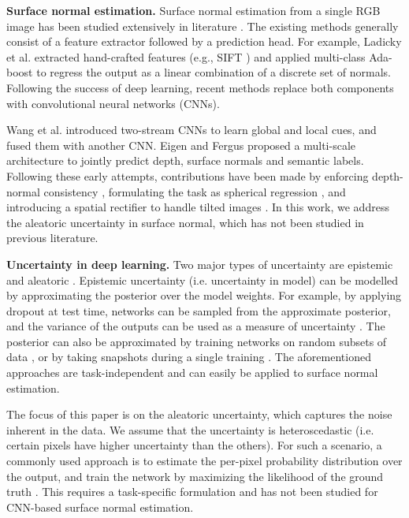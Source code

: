 \documentclass[10pt,twocolumn,letterpaper]{article}
\begin{document}
\noindent
\textbf{Surface normal estimation.} Surface normal estimation from a single RGB image has been studied extensively in literature \cite{SNfromRGB_13_3DP,SNfromRGB_14_Fouhey,SNfromRGB_14_Ladicky,SNfromRGB_15_Deep3D,SNfromRGB_15_Eigen,SNfromRGB_16_SkipNet,SNfromRGB_16_SURGE,SNfromRGB_18_GeoNet,SNfromRGB_19_FrameNet,SNfromRGB_19_PAP,SNfromRGB_19_SR,SNfromRGB_20_GeoNet++,SNfromRGB_20_TiltedSN,SNfromRGB_20_VPLNet}. The existing methods generally consist of a feature extractor followed by a prediction head. For example, Ladicky et al. \cite{SNfromRGB_14_Ladicky} extracted hand-crafted features (e.g., SIFT \cite{sift}) and applied multi-class Ada-boost \cite{adaboost} to regress the output as a linear combination of a discrete set of normals. Following the success of deep learning, recent methods replace both components with convolutional neural networks (CNNs). 

Wang et al. \cite{SNfromRGB_15_Deep3D} introduced two-stream CNNs to learn global and local cues, and fused them with another CNN. Eigen and Fergus \cite{SNfromRGB_15_Eigen} proposed a multi-scale architecture to jointly predict depth, surface normals and semantic labels. Following these early attempts, contributions have been made by enforcing depth-normal consistency \cite{SNfromRGB_18_GeoNet,SNfromRGB_20_GeoNet++}, formulating the task as spherical regression \cite{SNfromRGB_19_SR}, and introducing a spatial rectifier to handle tilted images \cite{SNfromRGB_20_TiltedSN}. In this work, we address the aleatoric uncertainty in surface normal, which has not been studied in previous literature.

\noindent
\textbf{Uncertainty in deep learning.} Two major types of uncertainty are epistemic and aleatoric \cite{aleatory_or_epistemic}. Epistemic uncertainty (i.e. uncertainty in model) can be modelled by approximating the posterior over the model weights. For example, by applying dropout \cite{dropout} at test time,  networks can be sampled from the approximate posterior, and the variance of the outputs can be used as a measure of uncertainty \cite{epiU-drop-gal}. The posterior can also be approximated by training  networks on random subsets of data \cite{epiU-2017-boot}, or by taking  snapshots during a single training \cite{epiU-2017-snap}. The aforementioned approaches are task-independent and can easily be applied to surface normal estimation.

The focus of this paper is on the aleatoric uncertainty, which captures the noise inherent in the data. We assume that the uncertainty is heteroscedastic \cite{what_uncertainties} (i.e. certain pixels have higher uncertainty than the others). For such a scenario, a commonly used approach is to estimate the per-pixel probability distribution over the output, and train the network by maximizing the likelihood of the ground truth \cite{what_uncertainties,prob_deep_net}. This requires a task-specific formulation and has not been studied for CNN-based surface normal estimation.
\end{document}
